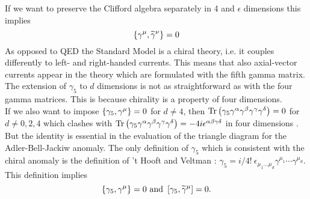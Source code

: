 If we want to preserve the Clifford algebra separately in 4 and $\epsilon$ dimensions this implies
\begin{equation}
\left\lbrace \gamma^{\mu},\widetilde{\gamma}^{\nu} \right\rbrace = 0
\end{equation}
As opposed to QED the Standard Model is a chiral theory, i.e. it couples differently to left- and right-handed currents. This means that also axial-vector currents appear in the theory which are formulated with the fifth gamma matrix. The extension of $\gamma_5$ to $d$ dimensions is not as straightforward as with the four gamma matrices. This is because chirality is a property of four dimensions.\\
If we also want to impose $\left\lbrace \gamma_5,\gamma^{\mu} \right\rbrace = 0$ for $d \neq 4$, then $\mathrm{Tr}\left( \gamma_5 \gamma^{\alpha}\gamma^{\beta}\gamma^{\gamma}\gamma^{\delta} \right) = 0$  for $d \neq 0,2,4$ which clashes with $\mathrm{Tr}\left( \gamma_5 \gamma^{\alpha}\gamma^{\beta}\gamma^{\gamma}\gamma^{\delta} \right) = -4i \epsilon^{\alpha\beta\gamma\delta}$ in four dimensions \cite{Gamma5}. But the identity is essential in the evaluation of the triangle diagram for the Adler-Bell-Jackiw anomaly. The only definition of $\gamma_5$ which is consistent with the chiral anomaly is the definition of 't Hooft and Veltman \cite{HVgamma5}: $\gamma_5 = i/4! \ \epsilon_{\mu_1 \dots \mu_d} \gamma^{\mu_1} \cdots \gamma^{\mu_d}$. This definition implies
\begin{equation}
\left\lbrace \gamma_5, \gamma^{\mu} \right\rbrace = 0  \text{ and }  \left[ \gamma_5, \widetilde{\gamma}^{\mu} \right] = 0.
\end{equation} 



